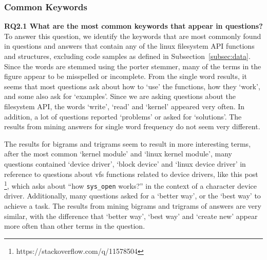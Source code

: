 \subsubsection{Common Keywords}
\textbf{RQ2.1 What are the most common keywords that appear in questions?}
To answer this question, we identify the keywords that are most commonly found in questions and answers that contain any of the linux filesystem API functions and structures, excluding code samples as defined in Subsection~\ref{subsec:data}. Since the words are stemmed using the porter stemmer, many of the terms in the figure appear to be misspelled or incomplete.
From the single word results, it seems that most questions ask about how to `use' the functions, how they `work', and some also ask for `examples'. Since we are asking questions about the filesystem API, the words `write', `read' and `kernel' appeared very often. In addition, a lot of questions reported `problems' or asked for `solutions'. The results from mining answers for single word frequency do not seem very different.

The results for bigrams and trigrams seem to result in more interesting terms, after the most common `kernel module' and `linux kernel module', many questions contained `device driver', `block device' and `linux device driver' in reference to questions about vfs functions related to device drivers, like this post \footnote{https://stackoverflow.com/q/11578504}, which asks about ``how \texttt{sys\_open} works?'' in the context of a character device driver. Additionally, many questions asked for a `better way', or the `best way' to achieve a task. The results from mining bigrams and trigrams of answers are very similar, with the difference that `better way', `best way' and `create new' appear more often than other terms in the question.

